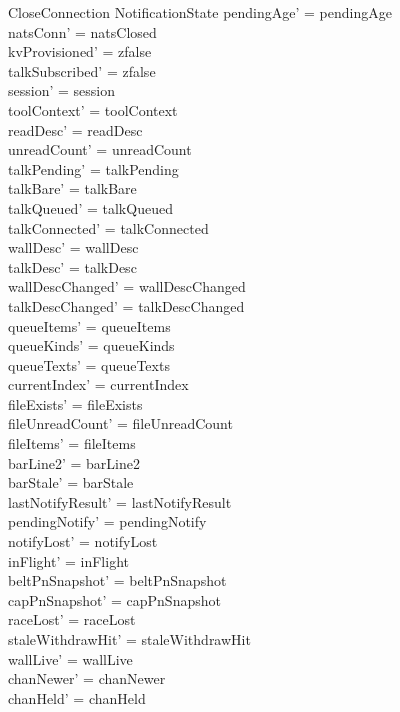 \documentclass[a4paper,10pt,fleqn]{article}
\begin{document}
\begin{schema}{CloseConnection}
  \Delta NotificationState
  \where
  pendingAge' = pendingAge \\
  natsConn' = natsClosed \\
  kvProvisioned' = zfalse \\
  talkSubscribed' = zfalse \\
  session' = session \\
  toolContext' = toolContext \\
  readDesc' = readDesc \\
  unreadCount' = unreadCount \\
  talkPending' = talkPending \\
  talkBare' = talkBare \\
  talkQueued' = talkQueued \\
  talkConnected' = talkConnected \\
  wallDesc' = wallDesc \\
  talkDesc' = talkDesc \\
  wallDescChanged' = wallDescChanged \\
  talkDescChanged' = talkDescChanged \\
  queueItems' = queueItems \\
  queueKinds' = queueKinds \\
  queueTexts' = queueTexts \\
  currentIndex' = currentIndex \\
  fileExists' = fileExists \\
  fileUnreadCount' = fileUnreadCount \\
  fileItems' = fileItems \\
  barLine2' = barLine2 \\
  barStale' = barStale \\
  lastNotifyResult' = lastNotifyResult \\
  pendingNotify' = pendingNotify \\
  notifyLost' = notifyLost \\
  inFlight' = inFlight \\
  beltPnSnapshot' = beltPnSnapshot \\
  capPnSnapshot' = capPnSnapshot \\
  raceLost' = raceLost \\
  staleWithdrawHit' = staleWithdrawHit \\
  wallLive' = wallLive \\
  chanNewer' = chanNewer \\
  chanHeld' = chanHeld \\

\end{schema}
\end{document}
